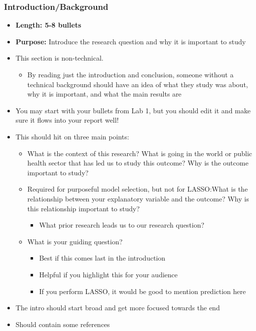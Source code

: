 \documentclass[
  letterpaper,
  DIV=11,
  numbers=noendperiod]{scrartcl}
\providecommand{\tightlist}{%
  \setlength{\itemsep}{0pt}\setlength{\parskip}{0pt}}
\begin{document}
\subsubsection{Introduction/Background}\label{introductionbackground}

\begin{itemize}
\tightlist
\item
  \textbf{Length: 5-8 bullets}
\item
  \textbf{Purpose:} Introduce the research question and why it is
  important to study
\item
  This section is non-technical.

  \begin{itemize}
  \tightlist
  \item
    By reading just the introduction and conclusion, someone without a
    technical background should have an idea of what they study was
    about, why it is important, and what the main results are
  \end{itemize}
\item
  You may start with your bullets from Lab 1, but you should edit it and
  make sure it flows into your report well!
\item
  This should hit on three main points:

  \begin{itemize}
  \tightlist
  \item
    What is the context of this research? What is going in the world or
    public health sector that has led us to study this outcome? Why is
    the outcome important to study?
  \item
    Required for {purposeful model selection}, but not for LASSO:What is
    the relationship between your explanatory variable and the outcome?
    Why is this relationship important to study?

    \begin{itemize}
    \tightlist
    \item
      What prior research leads us to our research question?
    \end{itemize}
  \item
    What is your guiding question?

    \begin{itemize}
    \tightlist
    \item
      Best if this comes last in the introduction
    \item
      Helpful if you highlight this for your audience
    \item
      If you perform {LASSO}, it would be good to mention prediction
      here
    \end{itemize}
  \end{itemize}
\item
  The intro should start broad and get more focused towards the end
\item
  Should contain some references
\end{itemize}
\end{document}

